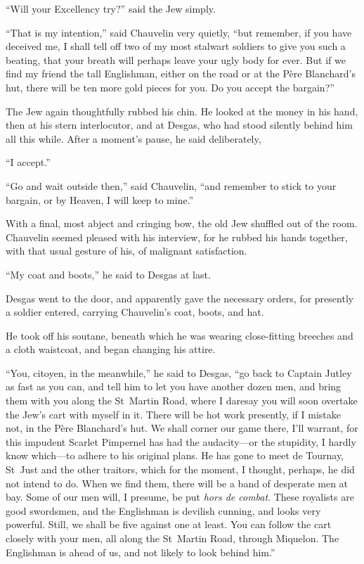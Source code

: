 \enquote{Will your Excellency try?} said the Jew simply.

\enquote{That is my intention,} said Chauvelin very quietly, \enquote{but remember, if you have deceived me, I shall tell off two of my most stalwart soldiers to give you such a beating, that your breath will perhaps leave your ugly body for ever. But if we find my friend the tall Englishman, either on the road or at the Père Blanchard's hut, there will be ten more gold pieces for you. Do you accept the bargain?}

The Jew again thoughtfully rubbed his chin. He looked at the money in his hand, then at his stern interlocutor, and at Desgas, who had stood silently behind him all this while. After a moment's pause, he said deliberately,\longdash


\enquote{I accept.}

\enquote{Go and wait outside then,} said Chauvelin, \enquote{and remember to stick to your bargain, or by Heaven, I will keep to mine.}

With a final, most abject and cringing bow, the old Jew shuffled out of the room. Chauvelin seemed pleased with his interview, for he rubbed his hands together, with that usual gesture of his, of malignant satisfaction.

\enquote{My coat and boots,} he said to Desgas at last.

Desgas went to the door, and apparently gave the necessary orders, for presently a soldier entered, carrying Chauvelin's coat, boots, and hat.

He took off his soutane, beneath which he was wearing close-fitting breeches and a cloth waistcoat, and began changing his attire.

\enquote{You, citoyen, in the meanwhile,} he said to Desgas, \enquote{go back to Captain Jutley as fast as you can, and tell him to let you have another dozen men, and bring them with you along the St~Martin Road, where I daresay you will soon overtake the Jew's cart with myself in it. There will be hot work presently, if I mistake not, in the Père Blanchard's hut. We shall corner our game there, I'll warrant, for this impudent Scarlet Pimpernel has had the audacity---or the stupidity, I hardly know which---to adhere to his original plans. He has gone to meet de Tournay, St~Just and the other traitors, which for the moment, I thought, perhaps, he did not intend to do. When we find them, there will be a band of desperate men at bay. Some of our men will, I presume, be put \textit{hors de combat}. These royalists are good swordsmen, and the Englishman is devilish cunning, and looks very powerful. Still, we shall be five against one at least. You can follow the cart closely with your men, all along the St~Martin Road, through Miquelon. The Englishman is ahead of us, and not likely to look behind him.}

